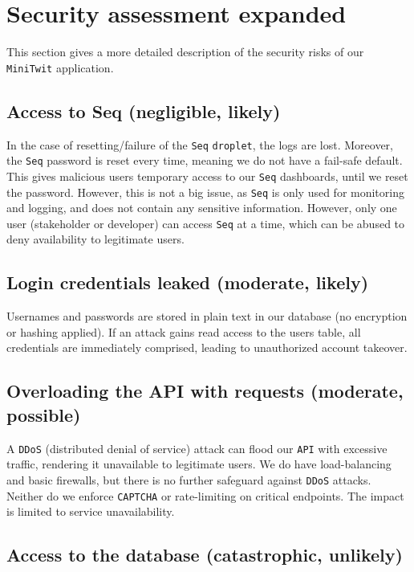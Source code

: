 \section{Security assessment expanded}
\label{appn:B}

This section gives a more detailed description of the security risks
of our \texttt{MiniTwit} application.

\subsection{Access to Seq (negligible, likely)}

In the case of resetting/failure of the \texttt{Seq} \texttt{droplet}, the logs 
are lost. Moreover, the \texttt{Seq} password is reset every time, meaning we 
do not have a fail-safe default. This gives malicious users temporary 
access to our \texttt{Seq} dashboards, until we reset the password. However, 
this is not a big issue, as \texttt{Seq} is only used for monitoring and logging, 
and does not contain any sensitive information. However, only one user 
(stakeholder or developer) can access \texttt{Seq} at a time, 
which can be abused to deny availability to legitimate users.

\subsection{Login credentials leaked (moderate, likely)}

Usernames and passwords are stored in plain text in our 
database (no encryption or hashing applied). If an attack 
gains read access to the users table, all credentials are 
immediately comprised, leading to unauthorized account takeover. 

\subsection{Overloading the API with requests (moderate, possible)}

A \texttt{DDoS} (distributed denial of service) attack can flood our \texttt{API} with 
excessive traffic, rendering it unavailable to legitimate users. 
We do have load-balancing and basic firewalls, but there is no 
further safeguard against \texttt{DDoS} attacks. Neither do we enforce \texttt{CAPTCHA} or 
rate-limiting on critical endpoints. 
The impact is limited to service unavailability. 

\subsection{Access to the database (catastrophic, unlikely)}

